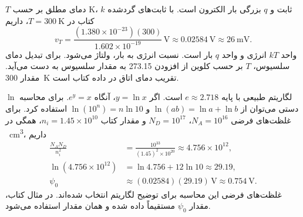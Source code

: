 \(T\) دمای مطلق بر حسب \unit{\kelvin}، \(k\) ثابت  و \(q\)
بزرگی بار الکترون است. با ثابت‌های گرد‌شده کتاب در \(T=\qty{300}{\kelvin}\)، داریم
\begin{equation*}
 v_T=\frac{(1.380\times10^{-23})(300)}{1.602\times10^{-19}}
 \,\unit{\volt}\approx\qty{0.02584}{\volt}\approx\qty{26}{\milli\volt}.
\end{equation*}
واحد \(kT\) انرژی و واحد \(q\) بار است. نسبت انرژی به بار، ولتاژ می‌شود.
برای تبدیل دمای سلسیوس، \(T\) بر حسب کلوین از افزودن \num{273.15} به مقدار
سلسیوس به دست می‌آید. مقدار \qty{300}{\kelvin} تقریب دمای اتاق در داده کتاب است.

\(\ln\) لگاریتم طبیعی با پایه \(e\approx\num{2.718}\) است.
اگر \(y=\ln x\)، آنگاه \(e^y=x\). برای محاسبه دستی می‌توان از
\(\ln(ab)=\ln a+\ln b\) و \(\ln(10^n)=n\ln10\) استفاده کرد.
برای غلظت‌های فرضی \(N_A=10^{16}\)، \(N_D=10^{17}\) و مقدار کتاب
\(n_i=1.45\times10^{10}\)، همگی در \unit{\per\centi\metre\cubed}، داریم
\begin{align*}
 \frac{N_AN_D}{n_i^2}
 &=\frac{10^{33}}{(1.45)^2\times10^{20}}
 \approx4.756\times10^{12},\\
 \ln(4.756\times10^{12})&=\ln4.756+12\ln10\approx29.19,\\
 \psi_0&\approx(0.02584)(29.19)\,\unit{\volt}\approx\qty{0.754}{\volt}.
\end{align*}
غلظت‌های فرضی این محاسبه برای توضیح لگاریتم انتخاب شده‌اند.
در مثال کتاب، مقدار \(\psi_0\) مستقیماً داده شده و همان مقدار استفاده می‌شود.

